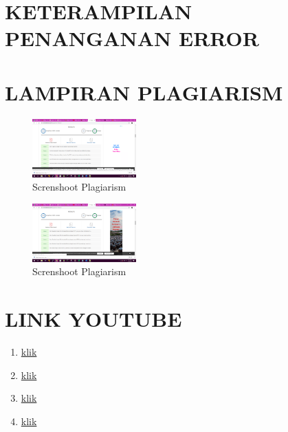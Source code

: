 \section{KETERAMPILAN PENANGANAN ERROR}

\section{LAMPIRAN PLAGIARISM}
\begin{figure}[H]
		\includegraphics[width=4cm]{figures/1184065/ss1.PNG}
		\centering
		\caption{Screnshoot Plagiarism}
	\end{figure}
	\begin{figure}[H]
		\includegraphics[width=4cm]{figures/1184065/ss2.PNG}
		\centering
		\caption{Screnshoot Plagiarism}
	\end{figure}
\section{LINK YOUTUBE}
\begin{enumerate}
\item \href{https://youtu.be/FDE8KrHC4m4}{klik}
\item \href{https://youtu.be/qzmEN1LVhsM}{klik}
\item \href{https://youtu.be/3UKVrJmwmYo}{klik}
\item \href{https://youtu.be/3UKVrJmwmYo}{klik}
\end{enumerate}







